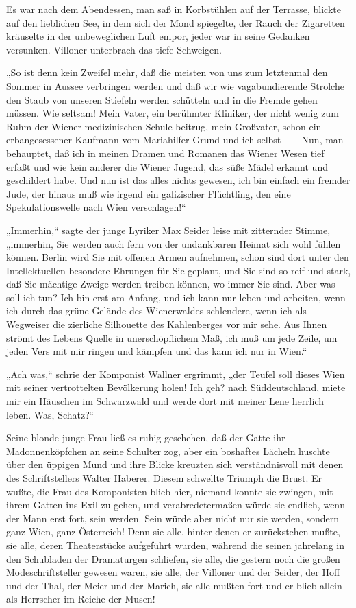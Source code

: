 Es war nach dem Abendessen, man saß in Korbstühlen auf der
Terrasse, blickte auf den lieblichen See, in dem sich der Mond
spiegelte, der Rauch der Zigaretten kräuselte in der unbeweglichen
Luft empor, jeder war in seine Gedanken versunken. Villoner
unterbrach das tiefe Schweigen.

„So ist denn kein Zweifel mehr, daß die meisten von uns zum
letztenmal den Sommer in Aussee verbringen werden und daß wir wie
vagabundierende Strolche den Staub von unseren Stiefeln werden
schütteln und in die Fremde gehen müssen. Wie seltsam! Mein Vater,
ein berühmter Kliniker, der nicht wenig zum Ruhm der Wiener
medizinischen Schule beitrug, mein Großvater, schon ein
erbangesessener Kaufmann vom Mariahilfer Grund und ich selbst –~–
Nun, man behauptet, daß ich in meinen Dramen und Romanen das Wiener
Wesen tief erfaßt und wie kein anderer die Wiener Jugend, das süße
Mädel erkannt und geschildert habe. Und nun ist das alles nichts
gewesen, ich bin einfach ein fremder Jude, der hinaus  muß wie irgend ein galizischer Flüchtling, den eine
Spekulationswelle nach Wien verschlagen!“

„Immerhin,“ sagte der junge Lyriker Max Seider leise mit zitternder
Stimme, „immerhin, Sie werden auch fern von der undankbaren Heimat
sich wohl fühlen können. Berlin wird Sie mit offenen Armen
aufnehmen, schon sind dort unter den Intellektuellen besondere
Ehrungen für Sie geplant, und Sie sind so reif und stark, daß Sie
mächtige Zweige werden treiben können, wo immer Sie sind. Aber was
soll ich tun? Ich bin erst am Anfang, und ich kann nur leben und
arbeiten, wenn ich durch das grüne Gelände des Wienerwaldes
schlendere, wenn ich als Wegweiser die zierliche Silhouette des
Kahlenberges vor mir sehe. Aus Ihnen strömt des Lebens Quelle in
unerschöpflichem Maß, ich muß um jede Zeile, um jeden Vers mit mir
ringen und kämpfen und das kann ich nur in Wien.“

„Ach was,“ schrie der Komponist Wallner ergrimmt, „der Teufel soll
dieses Wien mit seiner vertrottelten Bevölkerung holen! Ich geh?
nach Süddeutschland, miete mir ein Häuschen im Schwarzwald und
werde dort mit meiner Lene herrlich leben. Was, Schatz?“

Seine blonde junge Frau ließ es ruhig geschehen, daß der Gatte ihr
Madonnenköpfchen an seine Schulter zog, aber ein boshaftes Lächeln
huschte über den üppigen Mund und ihre Blicke kreuzten sich
verständnisvoll mit denen des Schriftstellers Walter Haberer.
Diesem schwellte Triumph die Brust. Er wußte, die Frau des
Komponisten blieb hier, niemand konnte sie zwingen, mit ihrem
Gatten ins Exil zu gehen, und verabredetermaßen würde sie endlich,
wenn  der Mann erst fort, sein werden. Sein würde
aber nicht nur sie werden, sondern ganz Wien, ganz Österreich!
Denn sie alle, hinter denen er zurückstehen mußte, sie alle, deren
Theaterstücke aufgeführt wurden, während die seinen jahrelang in
den Schubladen der Dramaturgen schliefen, sie alle, die gestern
noch die großen Modeschriftsteller gewesen waren, sie alle, der
Villoner und der Seider, der Hoff und der Thal, der Meier und der
Marich, sie alle mußten fort und er blieb allein als Herrscher im
Reiche der Musen!

